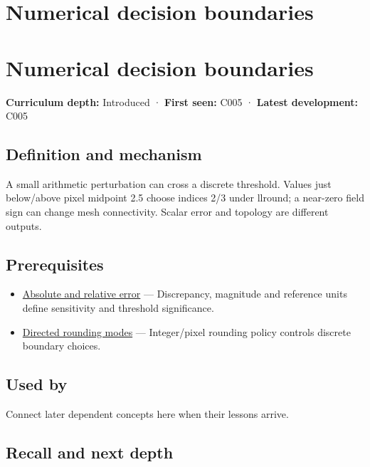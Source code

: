 \hypertarget{appendix-c80db39080be}{}
\section*{Numerical decision boundaries}
\section{Numerical decision boundaries}\label{numerical-decision-boundaries}

\textbf{Curriculum depth:} Introduced · \textbf{First seen:} C005 · \textbf{Latest development:} C005

\subsection{Definition and mechanism}\label{definition-and-mechanism}

A small arithmetic perturbation can cross a discrete threshold. Values just below/above pixel midpoint 2.5 choose indices 2/3 under llround; a near-zero field sign can change mesh connectivity. Scalar error and topology are different outputs.

\subsection{Prerequisites}\label{prerequisites}

\begin{itemize}
\tightlist
\item
  \hyperref[appendix-3ae74e89b4e6]{Absolute and relative error} --- Discrepancy, magnitude and reference units define sensitivity and threshold significance.
\item
  \hyperref[appendix-637d164ae5ca]{Directed rounding modes} --- Integer/pixel rounding policy controls discrete boundary choices.
\end{itemize}

\subsection{Used by}\label{used-by}

Connect later dependent concepts here when their lessons arrive.

\subsection{Recall and next depth}\label{recall-and-next-depth}

